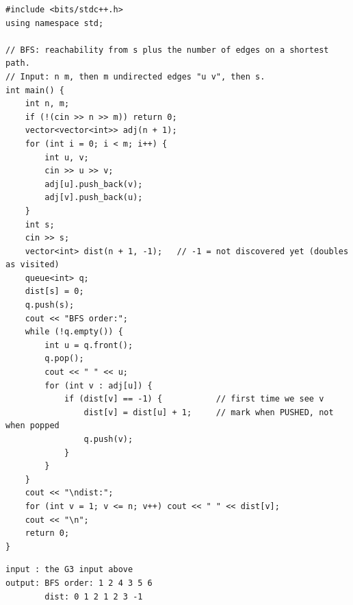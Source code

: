 \begin{lstlisting}[style=cpp]
#include <bits/stdc++.h>
using namespace std;

// BFS: reachability from s plus the number of edges on a shortest path.
// Input: n m, then m undirected edges "u v", then s.
int main() {
    int n, m;
    if (!(cin >> n >> m)) return 0;
    vector<vector<int>> adj(n + 1);
    for (int i = 0; i < m; i++) {
        int u, v;
        cin >> u >> v;
        adj[u].push_back(v);
        adj[v].push_back(u);
    }
    int s;
    cin >> s;
    vector<int> dist(n + 1, -1);   // -1 = not discovered yet (doubles as visited)
    queue<int> q;
    dist[s] = 0;
    q.push(s);
    cout << "BFS order:";
    while (!q.empty()) {
        int u = q.front();
        q.pop();
        cout << " " << u;
        for (int v : adj[u]) {
            if (dist[v] == -1) {           // first time we see v
                dist[v] = dist[u] + 1;     // mark when PUSHED, not when popped
                q.push(v);
            }
        }
    }
    cout << "\ndist:";
    for (int v = 1; v <= n; v++) cout << " " << dist[v];
    cout << "\n";
    return 0;
}
\end{lstlisting}

\begin{lstlisting}[style=trace]
input : the G3 input above
output: BFS order: 1 2 4 3 5 6
        dist: 0 1 2 1 2 3 -1
\end{lstlisting}

